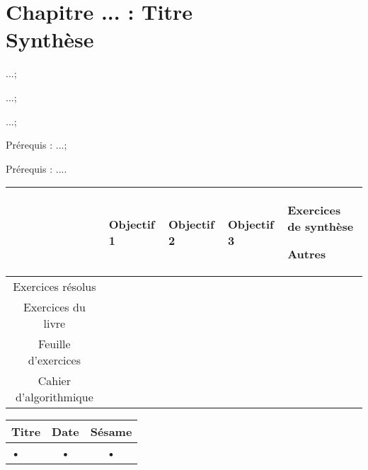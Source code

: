 \documentclass[landscape,french,11pt]{report}
\begin{document}
\fancyhf{}
\ReglePied
\entete{}{}{}


\renewcommand\CouleurChapitre{PineGreen}

\chapter{Chapitre ... : Titre \\ \Large Synthèse}

\thispagestyle{chapitre}
 \bigskip
\begin{multicols}{2}


 \begin{objectifs}
 \item ...;
 \item ...;
 \item ...;

\end{objectifs}

\begin{enligne}
\item Prérequis : ...;
\item Prérequis : ....
\end{enligne}

\end{multicols}

\begin{center}
\begin{tabular}{|m{4cm}|p{4cm}|p{4cm}|p{4cm}|p{4cm}|}
\cline{2-5} 
 \multicolumn{1}{c|}{}&  \multicolumn{1}{M{4cm}|}{Objectif 1} & \multicolumn{1}{M{4cm}|}{Objectif 2} & \multicolumn{1}{M{4cm}|}{Objectif 3} & \multicolumn{1}{M{4cm}|}{Exercices de synthèse \par Autres} \\ 
\hline 
\multicolumn{1}{|c|}{Exercices résolus}\par    & \vspace*{1.5cm} ~
 &  &  &  \\ 
\hline 
\multicolumn{1}{|c|}{Exercices du livre}  & \vspace*{1.5cm}~ & & & \\ 
\hline 
\multicolumn{1}{|c|}{Feuille d'exercices} &\vspace*{1.5cm}~    & & &  \\ 
\hline
\multicolumn{1}{|c|}{Cahier d'algorithmique}  & \vspace*{1.5cm}~  & & &  \\ 
\hline

\end{tabular} 

\end{center}

\begin{surEuler}
\begin{center}
\begin{tabular}{|l|c|c|}
\hline 
Titre & Date & Sésame \\ 
\hline 
• & • & • \\ 
\hline 
\end{tabular} 
\end{center}
\end{surEuler}
\end{document}
